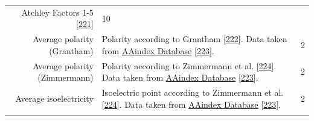 \documentclass[11pt,a4paper,twoside]{book}
\theoremstyle{definition}
\theoremstyle{definition}
\theoremstyle{remark}
\begin{document}
\begin{longtable}[]{@{}rlc@{}}
\begin{minipage}[t]{0.50\columnwidth}
Atchley Factors 1-5 {[}\protect\hyperlink{ref-Atchley2005}{221}{]}\strut
\end{minipage} & \begin{minipage}[t]{0.18\columnwidth}\centering\strut
10\strut
\end{minipage}\tabularnewline
\begin{minipage}[t]{0.23\columnwidth}\raggedleft\strut
Average polarity (Grantham)\strut
\end{minipage} & \begin{minipage}[t]{0.50\columnwidth}\raggedright\strut
Polarity according to Grantham
{[}\protect\hyperlink{ref-Grantham1974}{222}{]}. Data taken from
\href{http://www.genome.jp/dbget-bin/www_bget?aaindex:GRAR740102}{AAindex
Database} {[}\protect\hyperlink{ref-Kawashima2008}{223}{]}.\strut
\end{minipage} & \begin{minipage}[t]{0.18\columnwidth}\centering\strut
2\strut
\end{minipage}\tabularnewline
\begin{minipage}[t]{0.23\columnwidth}\raggedleft\strut
Average polarity (Zimmermann)\strut
\end{minipage} & \begin{minipage}[t]{0.50\columnwidth}\raggedright\strut
Polarity according to Zimmermann et al.
{[}\protect\hyperlink{ref-Zimmerman1968}{224}{]}. Data taken from
\href{http://www.genome.jp/dbget-bin/www_bget?aaindex:ZIMJ680103}{AAindex
Database} {[}\protect\hyperlink{ref-Kawashima2008}{223}{]}.\strut
\end{minipage} & \begin{minipage}[t]{0.18\columnwidth}\centering\strut
2\strut
\end{minipage}\tabularnewline
\begin{minipage}[t]{0.23\columnwidth}\raggedleft\strut
Average isoelectricity\strut
\end{minipage} & \begin{minipage}[t]{0.50\columnwidth}\raggedright\strut
Isoelectric point according to Zimmermann et al.
{[}\protect\hyperlink{ref-Zimmerman1968}{224}{]}. Data taken from
\href{http://www.genome.jp/dbget-bin/www_bget?aaindex:ZIMJ680104}{AAindex
Database} {[}\protect\hyperlink{ref-Kawashima2008}{223}{]}.\strut
\end{minipage} & \begin{minipage}[t]{0.18\columnwidth}\centering\strut
2\strut
\end{minipage}\tabularnewline
\begin{minipage}[t]{0.23\columnwidth}\raggedleft\strut

\end{minipage}
\end{longtable}
\end{document}
